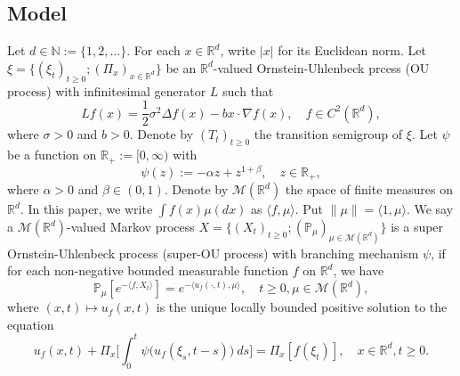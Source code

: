 \documentclass[12pt, a4paper]{amsart}
\theoremstyle{definition}
\numberwithin{equation}{section}
\begin{document}
\subsection{Model}
Let $d \in \mathbb N:= \{1,2,\dots\}$.
For each $x\in \mathbb{R}^d$, write $|x|$ for its Euclidean norm.
Let $\xi=\{(\xi_t)_{t\geq 0}; (\Pi_x)_{x\in \mathbb R^d}\}$ be an $\mathbb R^d$-valued Ornstein-Uhlenbeck prcess (OU process) with infinitesimal generator $L$ such that
\begin{equation}
\label{eq: OU generator}
    Lf(x)
    = \frac{1}{2}\sigma^2\Delta f(x)-b x \cdot \nabla f(x),
    \quad f \in C^2(\mathbb{R}^d),
\end{equation}
where $\sigma>0$ and $b>0$.
Denote by $(T_t)_{t\geq 0}$ the transition semigroup of $\xi$.
Let $\psi$ be a function on $\mathbb R_+:= [0,\infty)$ with
\begin{equation}\label{mechanism}
    \psi(z)
    := - \alpha z + z^{1+\beta},
    \quad z \in \mathbb R_+,
\end{equation}
where $\alpha > 0$ and $\beta \in (0,1) $.
Denote by $\mathcal{M}(\mathbb{R}^d)$ the space of finite measures on $\mathbb{R}^d$.
In this paper, we write $\int f(x)\mu(dx)$ as $\langle f,\mu\rangle$. Put $\|\mu\|=\langle 1,\mu\rangle$.
We say a $\mathcal{M}(\mathbb{R}^d)$-valued Markov process $X = \{(X_t)_{t\geq 0}; (\mathbb{P}_{\mu})_{\mu \in \mathcal M(\mathbb R^d)}\}$ is a super Ornstein-Uhlenbeck process (super-OU process) with branching mechanism $\psi$, if for each non-negative bounded measurable function $f$ on $\mathbb{R}^d$, we have
\begin{equation} \label{super}
    \mathbb{P}_{\mu}[e^{-\langle f,X_t \rangle}]
    = e^{-\langle u_f(\cdot , t), \mu \rangle},
    \quad t\geq 0, \mu \in \mathcal M(\mathbb R^d),
\end{equation}
where $(x,t) \mapsto u_f(x, t)$ is the unique locally bounded positive solution to the equation
\begin{equation}\label{eq1}
     u_f(x , t) + \Pi_x \Big[ \int_0^t\psi\big(u_f(\xi_s,t-s)\big)~ds\Big]
     = \Pi_x [f(\xi_t)],
     \quad x\in \mathbb R^d, t\geq 0.
\end{equation}
\end{document}
